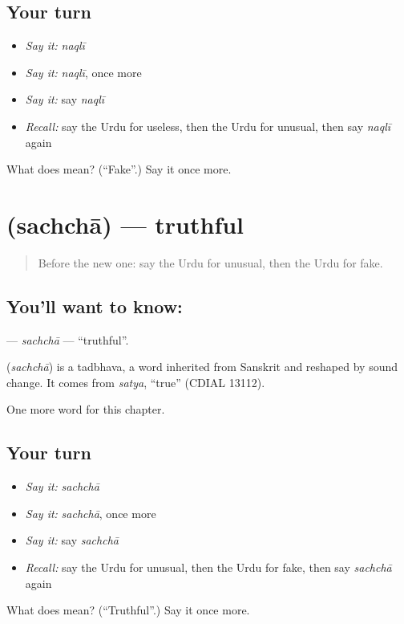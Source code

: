 \subsection*{Your turn}
\begin{itemize}
\raggedright
  \item \emph{Say it:} \emph{naqlī}
  \item \emph{Say it:} \emph{naqlī}, once more
  \item \emph{Say it:} say \emph{naqlī}
  \item \emph{Recall:} say the Urdu for useless, then the Urdu for unusual, then say \emph{naqlī} again
\end{itemize}

\begin{tcolorbox}[breakable,colback=teal!4,colframe=teal!35!black,title={Before you move on}]
What does  mean? (\textquotedblleft{}Fake\textquotedblright{}.) Say it once more.
\end{tcolorbox}
\section[\texorpdfstring{\ur{سچا} (sachchā)}{سچا (sachchā)}]{ (sachchā) — truthful}

\label{lesson:UR-C222-sachcha}



\begin{quote}
Before the new one: say the Urdu for unusual, then the Urdu for fake.
\end{quote}

\subsection*{You'll want to know: }
\textbf{} — \emph{sachchā} — \textquotedblleft{}truthful\textquotedblright{}.

\begin{cousinweb}
\textbf{} (\emph{sachchā}) is a tadbhava, a word inherited from Sanskrit and reshaped by sound change. It comes from \emph{satya}, \textquotedblleft{}true\textquotedblright{} (CDIAL 13112).
\end{cousinweb}

\begin{grammarlens}[title={What you've built}]
One more word for this chapter.
\end{grammarlens}

\subsection*{Your turn}
\begin{itemize}
\raggedright
  \item \emph{Say it:} \emph{sachchā}
  \item \emph{Say it:} \emph{sachchā}, once more
  \item \emph{Say it:} say \emph{sachchā}
  \item \emph{Recall:} say the Urdu for unusual, then the Urdu for fake, then say \emph{sachchā} again
\end{itemize}

\begin{tcolorbox}[breakable,colback=teal!4,colframe=teal!35!black,title={Before you move on}]
What does  mean? (\textquotedblleft{}Truthful\textquotedblright{}.) Say it once more.
\end{tcolorbox}
